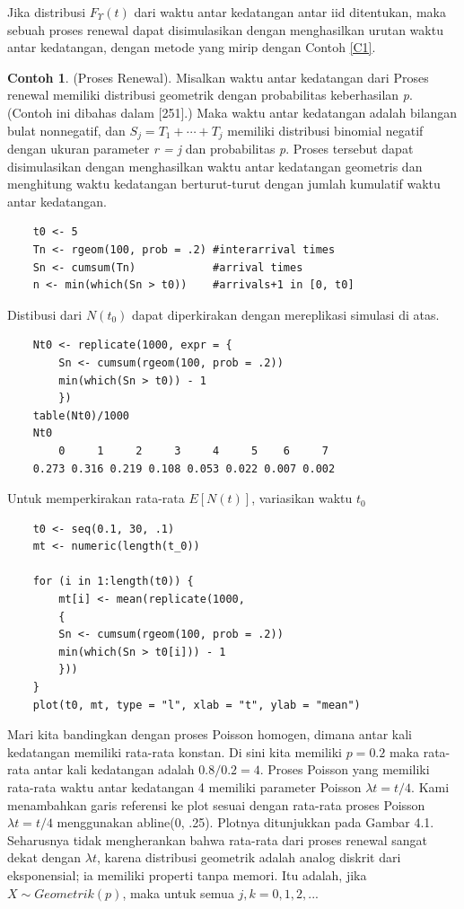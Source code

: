 \documentclass[a4paper,12pt]{article}
\theoremstyle{definition}
\newtheorem{example}{Contoh}[section]
\begin{document}
Jika distribusi $F_\Upsilon \left ( t \right )$ dari waktu antar kedatangan antar iid ditentukan, maka sebuah proses renewal dapat disimulasikan dengan menghasilkan urutan waktu antar kedatangan, dengan metode yang mirip dengan Contoh \ref{C1}.

\begin{example} (Proses Renewal). \label{K1C4}
Misalkan waktu antar kedatangan dari Proses renewal memiliki distribusi geometrik dengan probabilitas keberhasilan \textit{p}. (Contoh ini dibahas dalam [251].) Maka waktu antar kedatangan adalah bilangan bulat nonnegatif, dan $S_j=T_1+\cdots +T_j$ memiliki distribusi binomial negatif dengan ukuran parameter \textit{r = j} dan probabilitas \textit{p}. Proses tersebut dapat disimulasikan dengan menghasilkan waktu antar kedatangan geometris dan menghitung waktu kedatangan berturut-turut dengan jumlah kumulatif waktu antar kedatangan.

    \begin{lstlisting}
    t0 <- 5
    Tn <- rgeom(100, prob = .2) #interarrival times
    Sn <- cumsum(Tn)            #arrival times
    n <- min(which(Sn > t0))    #arrivals+1 in [0, t0]
    \end{lstlisting}

Distibusi dari $N(t_0)$ dapat diperkirakan dengan mereplikasi simulasi di atas.

    \begin{lstlisting}
    Nt0 <- replicate(1000, expr = {
        Sn <- cumsum(rgeom(100, prob = .2))
        min(which(Sn > t0)) - 1
        })
    table(Nt0)/1000
    Nt0
        0     1     2     3     4     5    6     7
    0.273 0.316 0.219 0.108 0.053 0.022 0.007 0.002
    \end{lstlisting}

Untuk memperkirakan rata-rata $E[N(t)]$, variasikan waktu $t_0$

    \begin{lstlisting}
    t0 <- seq(0.1, 30, .1)
    mt <- numeric(length(t_0))

    for (i in 1:length(t0)) {
        mt[i] <- mean(replicate(1000,
        {
        Sn <- cumsum(rgeom(100, prob = .2))
        min(which(Sn > t0[i])) - 1
        }))
    }
    plot(t0, mt, type = "l", xlab = "t", ylab = "mean")
    \end{lstlisting}

Mari kita bandingkan dengan proses Poisson homogen, dimana antar kali kedatangan memiliki rata-rata konstan. Di sini kita memiliki $p=0.2$ maka rata-rata antar kali kedatangan adalah $0.8/0.2=4$. Proses Poisson yang memiliki rata-rata waktu antar kedatangan 4 memiliki parameter Poisson $\lambda t = t/4$. Kami menambahkan garis referensi ke plot sesuai dengan rata-rata proses Poisson $\lambda t = t/4$ menggunakan abline(0, .25).
Plotnya ditunjukkan pada Gambar 4.1. Seharusnya tidak mengherankan bahwa rata-rata dari proses renewal sangat dekat dengan $\lambda t$, karena distribusi geometrik adalah analog diskrit dari eksponensial; ia memiliki properti tanpa memori. Itu adalah, jika $X \sim Geometrik(p)$, maka untuk semua $j, k = 0, 1, 2, ...$


\end{example}
\end{document}
